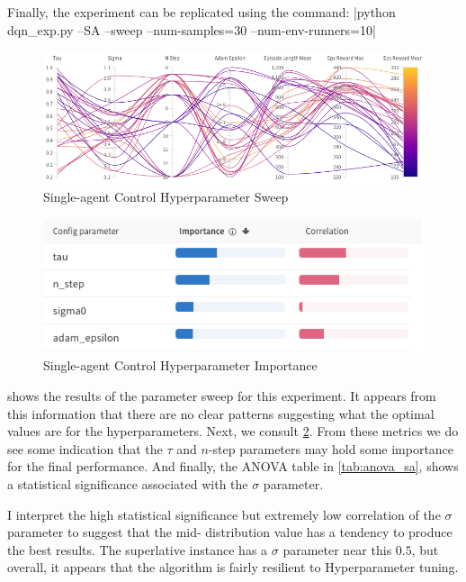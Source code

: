 \documentclass[12pt,letterpaper]{exam}
\begin{document}
\begin{questions}
    Finally, the experiment can be replicated using the command:	
|python dqn_exp.py --SA --sweep --num-samples=30 --num-env-runners=10|
%
    \begin{figure}
        \centering
        \includegraphics[width=.90\linewidth]{para_coord_sa.png}
        \caption{Single-agent Control Hyperparameter Sweep}
        \label{fig:sa_para}
    \end{figure}
    \begin{figure}
        \centering
        \includegraphics[width=.5\linewidth]{importance_sa.png}
        \caption{Single-agent Control Hyperparameter Importance}
        \label{fig:sa_importance}
    \end{figure}
%
     shows the results of the parameter sweep for this
    experiment. It appears from this information that there are no clear
    patterns suggesting what the optimal values are for the hyperparameters.
    Next, we consult \cref{fig:sa_importance}. 
    From these metrics we do 
    see some indication that the \(\tau\) and \(n\)-step parameters
    may hold some importance for the final performance.
    And finally, the ANOVA table in \cref{tab:anova_sa}, shows 
    a statistical significance associated with the \(\sigma\)
    parameter. 

    I interpret the high statistical significance but extremely low
    correlation of the \(\sigma\) parameter to suggest that the mid-%
    distribution value has a tendency to produce the best results.
    The superlative instance has a \(\sigma\) parameter near this \(0.5\),
    but overall, it appears that the algorithm is fairly resilient
    to Hyperparameter tuning.



\end{questions}
\end{document}
